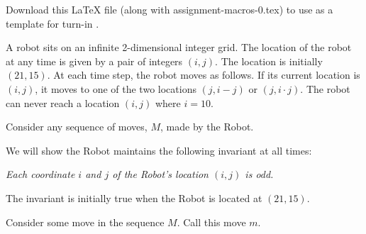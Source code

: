 \documentclass[11pt]{article}
\begin{document}
Download this LaTeX file (along with \textsf{assignment-macros-0.tex}) to use as a template for turn-in \turnIn.


\begin{theorem}
  A robot sits on an infinite 2-dimensional integer grid. The location of the robot at any time 
  is given by a pair of integers $(i, j)$. The location is initially $(21, 15)$. At each time 
  step, the robot moves as follows. If its current location is $(i,j)$, it moves to one of the 
  two locations $(j, i - j)$ or $(j, i\cdot j)$. The robot can never reach a location $(i, j)$ where $i = 10$.
\end{theorem}

\begin{longFormProof}


  \begin{block}[A]
    {Consider any sequence of moves, $M$, made by the Robot.}

    \step We will show the Robot maintains the following invariant at all times:
    \begin{center}\textit{Each coordinate $i$ and $j$ of the Robot's location $(i, j)$ is odd.}\end{center}

    \step The invariant is initially true when the Robot is located at $(21, 15)$.
    \begin{block}[B]
      {Consider some move in the sequence $M$. Call this move $m$.}


\end{block}
\end{block}
\end{longFormProof}
\end{document}

